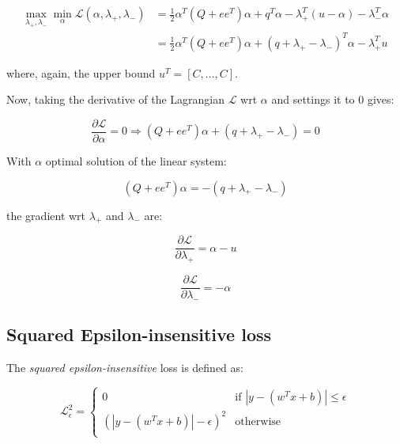 \begin{equation} \label{eq:svr_bcqp_lagrangian_dual}
	\begin{aligned}
    	\max_{\lambda_+,\lambda_-} \min_{\alpha} \mathcal{L}(\alpha,\lambda_+,\lambda_-) &= \frac{1}{2} \alpha^T (Q + ee^T)\alpha+q^T\alpha - \lambda_+^T (u - \alpha) - \lambda_-^T \alpha \\
    &= \frac{1}{2} \alpha^T (Q + ee^T)\alpha + (q + \lambda_+ - \lambda_-)^T \alpha - \lambda_+^T u
	\end{aligned}
\end{equation}

where, again, the upper bound $u^T = [C, \dots, C]$.

Now, taking the derivative of the Lagrangian $\mathcal{L}$ wrt $\alpha$ and settings it to 0 gives:

\begin{equation} \label{eq:svr_bcqp_lagrangian_der_a}
	\frac{\partial \mathcal{L}}{\partial \alpha}=0\Rightarrow (Q + ee^T) \alpha + (q + \lambda_+ - \lambda_-) = 0
\end{equation}

With $\alpha$ optimal solution of the linear system:

\begin{equation} \label{eq:svr_bcqp_lagrangian_sol}
    (Q + ee^T) \alpha = - (q + \lambda_+ - \lambda_-)
\end{equation}

the gradient wrt $\lambda_+$ and $\lambda_-$ are:

\begin{equation} \label{eq:svr_bcqp_lagrangian_der_lp}
	\frac{\partial \mathcal{L}}{\partial \lambda_+}=\alpha - u
\end{equation}

\begin{equation} \label{eq:svr_bcqp_lagrangian_der_lm}
    \frac{\partial \mathcal{L}}{\partial \lambda_-}=-\alpha
\end{equation}

\subsection{Squared Epsilon-insensitive loss}

The \emph{squared epsilon-insensitive} loss is defined as:

\begin{equation} \label{eq:squared_eps_loss1}
	\mathcal{L}_\epsilon^2 = 
	\begin{cases}
		0 & \text{if } |y - (w^T x + b)| \leq \epsilon \\
		(|y - (w^T x + b)| - \epsilon)^2 & \text{otherwise} \\
	\end{cases}
\end{equation}

